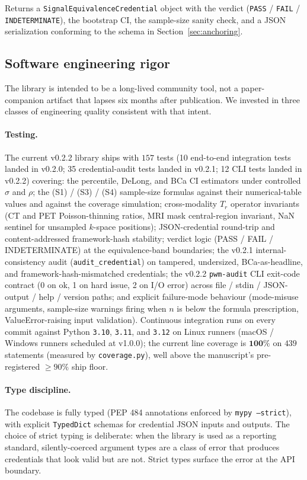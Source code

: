 \documentclass[twoside,11pt]{article}
\begin{document}
Returns a \texttt{SignalEquivalenceCredential} object with the verdict (\texttt{PASS} / \texttt{FAIL} / \texttt{INDETERMINATE}), the bootstrap CI, the sample-size sanity check, and a JSON serialization conforming to the schema in Section~\ref{sec:anchoring}.

\subsection{Software engineering rigor}
\label{sec:software_rigor}

The library is intended to be a long-lived community tool, not a paper-companion artifact that lapses six months after publication. We invested in three classes of engineering quality consistent with that intent.

\paragraph{Testing.} The current v0.2.2 library ships with $157$ tests (10 end-to-end integration tests landed in v0.2.0; 35 credential-audit tests landed in v0.2.1; 12 CLI tests landed in v0.2.2) covering: the percentile, DeLong, and BCa CI estimators under controlled $\sigma$ and $\rho$; the (S1) / (S3) / (S4) sample-size formulas against their numerical-table values and against the coverage simulation; cross-modality $T_r$ operator invariants (CT and PET Poisson-thinning ratios, MRI mask central-region invariant, NaN sentinel for unsampled $k$-space positions); JSON-credential round-trip and content-addressed framework-hash stability; verdict logic (PASS / FAIL / INDETERMINATE) at the equivalence-band boundaries; the v0.2.1 internal-consistency audit (\texttt{audit\_credential}) on tampered, undersized, BCa-as-headline, and framework-hash-mismatched credentials; the v0.2.2 \texttt{pwm-audit} CLI exit-code contract (0 on ok, 1 on hard issue, 2 on I/O error) across file / stdin / JSON-output / help / version paths; and explicit failure-mode behaviour (mode-misuse arguments, sample-size warnings firing when $n$ is below the formula prescription, ValueError-raising input validation). Continuous integration runs on every commit against Python \texttt{3.10}, \texttt{3.11}, and \texttt{3.12} on Linux runners (macOS / Windows runners scheduled at v1.0.0); the current line coverage is $\mathbf{100\%}$ on $439$ statements (measured by \texttt{coverage.py}), well above the manuscript's pre-registered $\geq 90\%$ ship floor.

\paragraph{Type discipline.} The codebase is fully typed (PEP 484 annotations enforced by \texttt{mypy --strict}), with explicit \texttt{TypedDict} schemas for credential JSON inputs and outputs. The choice of strict typing is deliberate: when the library is used as a reporting standard, silently-coerced argument types are a class of error that produces credentials that look valid but are not. Strict types surface the error at the API boundary.
\end{document}
